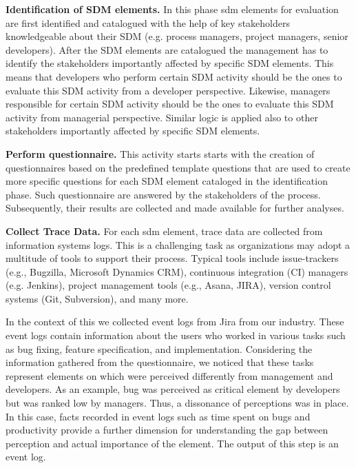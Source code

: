 \begin{inparadesc}
	\item[\bfseries Identification of SDM elements.] In this phase \gls{sdm} elements for evaluation are first identified and catalogued with the help of key stakeholders knowledgeable about their SDM (e.g. process managers, project managers, senior developers). After the SDM elements are catalogued the management has to identify the stakeholders importantly affected by specific SDM elements. This means that developers who perform certain SDM activity should be the ones to evaluate this SDM activity from a developer perspective. Likewise, managers responsible for certain SDM activity should be the ones to evaluate this SDM activity from managerial perspective. Similar logic is applied also to other stakeholders importantly affected by specific SDM elements. \\
	
	\item[\bfseries Perform questionnaire.] This activity starts starts with the creation of questionnaires based on the predefined template questions that are used to create more specific questions for each SDM element cataloged in the identification phase. Such questionnaire are answered by the stakeholders of the process. Subsequently, their results are collected and made available for further analyses. \\
	
	\item[\bfseries Collect Trace Data.] For each \gls{sdm} element, trace data are collected from information systems logs. This is a challenging task as organizations may adopt a multitude of tools to support their process. Typical tools include issue-trackers (e.g., Bugzilla, Microsoft Dynamics CRM), continuous integration (CI) managers (e.g. Jenkins), project management tools (e.g., Asana, JIRA), version control systems (Git, Subversion), and many more. 
	
	In the context of this we collected event logs from Jira from our industry. These event logs contain information about the users who worked in various tasks such as bug fixing, feature specification, and implementation. Considering the information gathered from the questionnaire, we noticed that these tasks represent elements on which were perceived differently from management and developers. As an example, bug was perceived as critical element by developers but was ranked low by managers. Thus, a dissonance of perceptions was in place. In this case, facts recorded in event logs such as time spent on bugs and productivity provide a further dimension for understanding the gap between perception and actual importance of the element. The output of this step is an event log. \\
	

\end{inparadesc}

